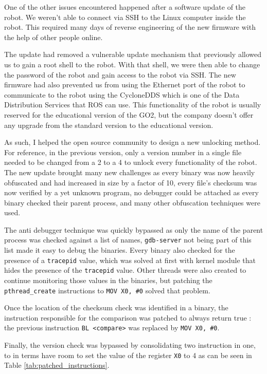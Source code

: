 \documentclass[12pt]{article}
\begin{document}
        One of the other issues encountered happened after a software update of the robot. We weren't able to connect via SSH to the Linux computer inside the robot. This required many days of reverse engineering of the new firmware with the help of other people online.

        The update had removed a vulnerable update mechanism that previously allowed us to gain a root shell to the robot. With that shell, we were then able to change the password of the robot and gain access to the robot via SSH. The new firmware had also prevented us from using the Ethernet port of the robot to communicate to the robot using the CycloneDDS which is one of the Data Distribution Services that ROS can use. This functionality of the robot is usually reserved for the educational version of the GO2, but the company doesn't offer any upgrade from the standard version to the educational version.

        As such, I helped the open source community to design a new unlocking method. For reference, in the previous version, only a version number in a single file needed to be changed from a 2 to a 4 to unlock every functionality of the robot. The new update brought many new challenges as every binary was now heavily obfuscated and had increased in size by a factor of 10, every file's checksum was now verified by a yet unknown program, no debugger could be attached as every binary checked their parent process, and many other obfuscation techniques were used.

        The anti debugger technique was quickly bypassed as only the name of the parent process was checked against a list of names, \texttt{gdb-server} not being part of this list made it easy to debug the binaries. Every binary also checked for the presence of a \texttt{tracepid} value, which was solved at first with kernel module that hides the presence of the \texttt{tracepid} value. Other threads were also created to continue monitoring those values in the binaries, but patching the \texttt{pthread\_create} instructions to \texttt{MOV X0, \#0} solved that problem.

        Once the location of the checksum check was identified in a binary, the instruction responsible for the comparison was patched to always return true : the previous instruction \texttt{BL <compare>} was replaced by \texttt{MOV X0, \#0}.

        Finally, the version check was bypassed by consolidating two instruction in one, to in terms have room to set the value of the register \texttt{X0} to 4 as can be seen in Table \ref{tab:patched_instructions}.
        
\end{document}
